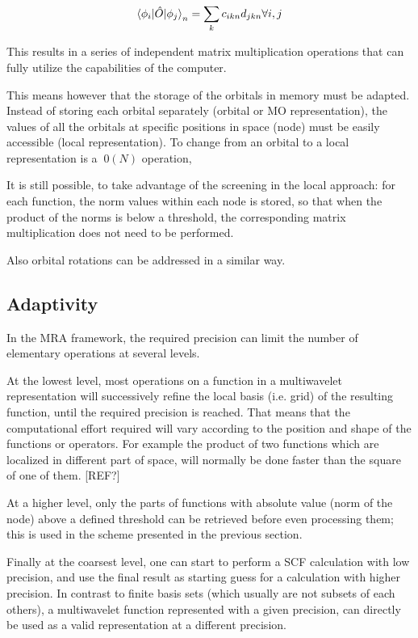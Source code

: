 \documentclass[%
 aip,
 amsmath,amssymb,
 reprint,%
]{revtex4-1}
\begin{document}
\begin{equation}
\label{equ:sum}
  \braket{\phi_i | {\hat O} |\phi_j}_n = \sum_{k} c_{ikn} d_{jkn} \forall i,j
\end{equation}

This results in a series of independent matrix multiplication operations that can fully utilize the capabilities of the computer. 

This means however that the storage of the orbitals in memory must be adapted. Instead of storing each orbital separately (orbital or MO representation), the values of all the orbitals at specific positions in space (node) must be easily accessible (local representation). To change from an orbital to a local representation is a $~0(N)$ operation,

It is still possible, to take advantage of the screening in the local approach: for each function, the norm values within each node is stored, so that when the product of the norms is below a threshold, the corresponding matrix multiplication does not need to be performed.

Also orbital rotations can be addressed in a similar way.




\subsection{Adaptivity}

In the MRA framework, the required precision can limit the number of elementary operations at several levels.

At the lowest level, most operations on a function in a multiwavelet representation will successively refine the local basis (i.e. grid) of the resulting function, until the required precision is reached. That means that the computational effort required will vary according to the position and shape of the functions or operators. For example the product of two functions which are localized in different part of space, will normally be done faster than the square of one of them. [REF?]

At a higher level, only the parts of functions with absolute value (norm of the node) above a defined threshold can be retrieved before even processing them; this is used in the scheme presented in the previous section.

Finally at the coarsest level, one can start to perform a SCF calculation with low precision, and use the final result as starting guess for a calculation with higher precision. In contrast to finite basis sets (which usually are not subsets of each others), a multiwavelet function represented with a given precision, can directly be used as a valid representation at a different precision.
\end{document}
